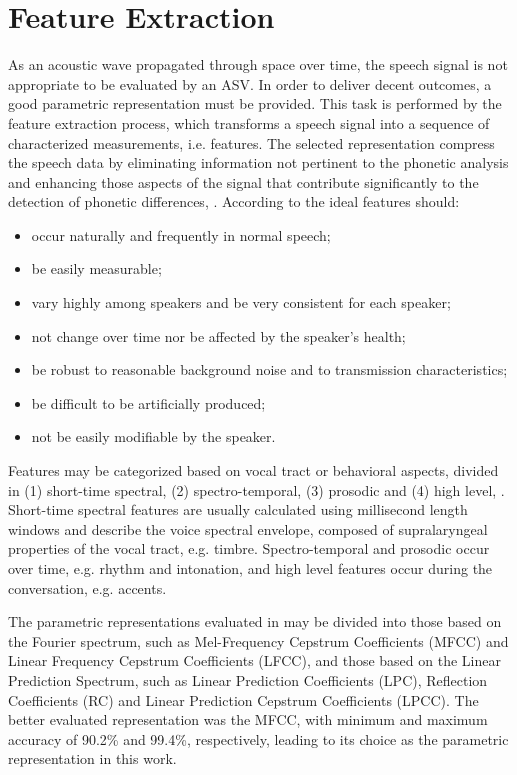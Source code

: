 \chapter{Feature Extraction}
\label{ch:feature-extraction}

As an acoustic wave propagated through space over time, the speech signal is not appropriate to be evaluated by an ASV. In order to deliver decent outcomes, a good parametric representation must be provided. This task is performed by the feature extraction process, which transforms a speech signal into a sequence of characterized measurements, i.e. features. The selected representation compress the speech data by eliminating information not pertinent to the phonetic analysis and enhancing those aspects of the signal that contribute significantly to the detection of phonetic differences, . According to  the ideal features should:

\begin{itemize}\itemsep0pt
    \item occur naturally and frequently in normal speech;
    \item be easily measurable;
    \item vary highly among speakers and be very consistent for each speaker;
    \item not change over time nor be affected by the speaker's health;
    \item be robust to reasonable background noise and to transmission
    characteristics;
    \item be difficult to be artificially produced;
    \item not be easily modifiable by the speaker.
\end{itemize}

Features may be categorized based on vocal tract or behavioral aspects, divided in (1) short-time spectral, (2) spectro-temporal, (3) prosodic and (4) high level, . Short-time spectral features are usually calculated using millisecond length windows and describe the voice spectral envelope, composed of supralaryngeal properties of the vocal tract, e.g. timbre. Spectro-temporal and prosodic occur over time, e.g. rhythm and intonation, and high level features occur during the conversation, e.g. accents.

The parametric representations evaluated in  may be divided into those based on the Fourier spectrum, such as Mel-Frequency Cepstrum Coefficients (MFCC) and Linear Frequency Cepstrum Coefficients (LFCC), and those based on the Linear Prediction Spectrum, such as Linear Prediction Coefficients (LPC), Reflection Coefficients (RC) and Linear Prediction Cepstrum Coefficients (LPCC). The better evaluated representation was the MFCC, with minimum and maximum accuracy of 90.2\% and 99.4\%, respectively, leading to its choice as the parametric representation in this work.

